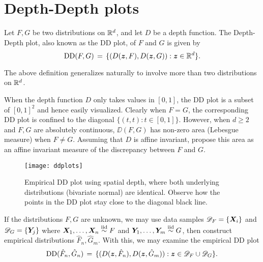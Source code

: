 \section{Depth-Depth plots}

\begin{definition}[DD plot] \label{def:ddplot}
    Let $F, G$ be two distributions on $\mathbb{R}^d$, and let $D$ be a depth
    function. The Depth-Depth plot, also known as the DD plot, of $F$ and $G$
    is given by
    \begin{equation}
        \operatorname{DD}(F, G) \,=\, \{(D(\bm{z}, F), D(\bm{z}, G)) : \bm{z} \in \mathbb{R}^d\}.
    \end{equation}
\end{definition}
\begin{remark}
    The above definition generalizes naturally to involve more than two
    distributions on $\mathbb{R}^d$.
\end{remark}

When the depth function $D$ only takes values in $[0, 1]$, the DD plot is a
subset of $[0, 1]^2$ and hence easily visualized.
Clearly when $F = G$, the corresponding DD plot is confined to the diagonal
$\{(t, t) : t \in [0, 1]\}$.
However, when $d \geq 2$ and $F, G$ are absolutely continuous, $\DD(F, G)$ has
non-zero area (Lebesgue measure) when $F \neq G$.
Assuming that $D$ is affine invariant, \textcite{liu-parelius-singh-1999}
propose this area as an affine invariant measure of the discrepancy between
$F$ and $G$.



\begin{figure}
    \centering
    \texttt{[image: ddplots]}
    \caption{
        Empirical DD plot using spatial depth, where both underlying
        distributions (bivariate normal) are identical.
        Observe how the points in the DD plot stay close to the diagonal black
        line.
    }
    \label{fig:ddplots_identical}
\end{figure}



If the distributions $F, G$ are unknown, we may use data samples
$\mathscr{D}_F = \{\bm{X}_i\}$ and $\mathscr{D}_G = \{\bm{Y}_j\}$ where $\bm{X}_1,
\dots, \bm{X}_n \overset{\text{iid}}{\sim} F$ and $\bm{Y}_1, \dots, \bm{Y}_m \overset{\text{iid}}{\sim} G$, then construct
empirical distributions $\hat{F}_n, \hat{G}_m$.
With this, we may examine the empirical DD plot
\begin{equation}
    \operatorname{DD}(\hat{F}_n, \hat{G}_n) \,=\, \{(D(\bm{z}, \hat{F}_n), D(\bm{z}, \hat{G}_m)) : \bm{z} \in \mathscr{D}_F \cup \mathscr{D}_G\}.
\end{equation}

